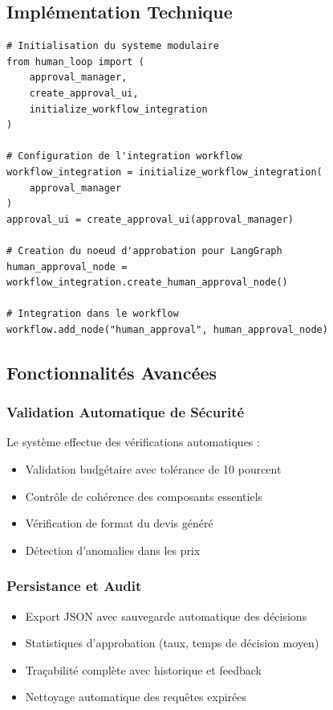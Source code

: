 \documentclass[12pt,a4paper]{article}
\begin{document}
\subsection{Impl\'ementation Technique}

\begin{lstlisting}[caption={Int\'egration modulaire du Human-in-the-Loop}]
# Initialisation du systeme modulaire
from human_loop import (
    approval_manager, 
    create_approval_ui, 
    initialize_workflow_integration
)

# Configuration de l'integration workflow
workflow_integration = initialize_workflow_integration(
    approval_manager
)
approval_ui = create_approval_ui(approval_manager)

# Creation du noeud d'approbation pour LangGraph
human_approval_node = workflow_integration.create_human_approval_node()

# Integration dans le workflow
workflow.add_node("human_approval", human_approval_node)
\end{lstlisting}

\subsection{Fonctionnalit\'es Avanc\'ees}

\subsubsection{Validation Automatique de S\'ecurit\'e}
Le syst\`eme effectue des v\'erifications automatiques :
\begin{itemize}
    \item Validation budg\'etaire avec tol\'erance de 10 pourcent
    \item Contr\^ole de coh\'erence des composants essentiels
    \item V\'erification de format du devis g\'en\'er\'e
    \item D\'etection d'anomalies dans les prix
\end{itemize}

\subsubsection{Persistance et Audit}
\begin{itemize}
    \item Export JSON avec sauvegarde automatique des d\'ecisions
    \item Statistiques d'approbation (taux, temps de d\'ecision moyen)
    \item Tra\c{c}abilit\'e compl\`ete avec historique et feedback
    \item Nettoyage automatique des requ\^etes expir\'ees
\end{itemize}
\end{document}
